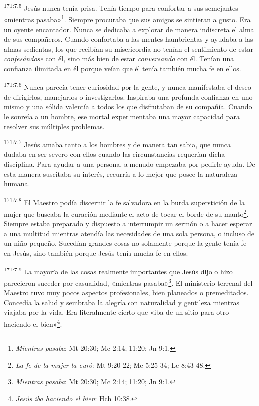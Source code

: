 \par 
\textsuperscript{171:7.5} Jesús nunca tenía prisa. Tenía tiempo para confortar a sus semejantes «mientras pasaba»\footnote{\textit{Mientras pasaba}: Mt 20:30; Mc 2:14; 11:20; Jn 9:1.}. Siempre procuraba que sus amigos se sintieran a gusto. Era un oyente encantador. Nunca se dedicaba a explorar de manera indiscreta el alma de sus compañeros. Cuando confortaba a las mentes hambrientas y ayudaba a las almas sedientas, los que recibían su misericordia no tenían el sentimiento de estar \textit{confesándose} con él, sino más bien de estar \textit{conversando} con él. Tenían una confianza ilimitada en él porque veían que él tenía también mucha fe en ellos.

\par 
\textsuperscript{171:7.6} Nunca parecía tener curiosidad por la gente, y nunca manifestaba el deseo de dirigirlos, manejarlos o investigarlos. Inspiraba una profunda confianza en uno mismo y una sólida valentía a todos los que disfrutaban de su compañía. Cuando le sonreía a un hombre, ese mortal experimentaba una mayor capacidad para resolver sus múltiples problemas.

\par 
\textsuperscript{171:7.7} Jesús amaba tanto a los hombres y de manera tan sabia, que nunca dudaba en ser severo con ellos cuando las circunstancias requerían dicha disciplina. Para ayudar a una persona, a menudo empezaba por pedirle ayuda. De esta manera suscitaba su interés, recurría a lo mejor que posee la naturaleza humana.

\par 
\textsuperscript{171:7.8} El Maestro podía discernir la fe salvadora en la burda superstición de la mujer que buscaba la curación mediante el acto de tocar el borde de su manto\footnote{\textit{La fe de la mujer la curó}: Mt 9:20-22; Mc 5:25-34; Lc 8:43-48.}. Siempre estaba preparado y dispuesto a interrumpir un sermón o a hacer esperar a una multitud mientras atendía las necesidades de una sola persona, o incluso de un niño pequeño. Sucedían grandes cosas no solamente porque la gente tenía fe en Jesús, sino también porque Jesús tenía mucha fe en ellos.

\par 
\textsuperscript{171:7.9} La mayoría de las cosas realmente importantes que Jesús dijo o hizo parecieron suceder por casualidad, «mientras pasaba»\footnote{\textit{Mientras pasaba}: Mt 20:30; Mc 2:14; 11:20; Jn 9:1.}. El ministerio terrenal del Maestro tuvo muy pocos aspectos profesionales, bien planeados o premeditados. Concedía la salud y sembraba la alegría con naturalidad y gentileza mientras viajaba por la vida. Era literalmente cierto que «iba de un sitio para otro haciendo el bien»\footnote{\textit{Jesús iba haciendo el bien}: Hch 10:38.}.

